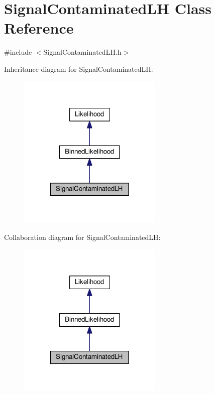 \hypertarget{classSignalContaminatedLH}{\section{Signal\-Contaminated\-L\-H Class Reference}
\label{classSignalContaminatedLH}
}


{\ttfamily \#include $<$Signal\-Contaminated\-L\-H.\-h$>$}



Inheritance diagram for Signal\-Contaminated\-L\-H\-:
\nopagebreak
\begin{figure}[H]
\begin{center}
\leavevmode
\includegraphics[width=196pt]{classSignalContaminatedLH__inherit__graph}
\end{center}
\end{figure}


Collaboration diagram for Signal\-Contaminated\-L\-H\-:
\nopagebreak
\begin{figure}[H]
\begin{center}
\leavevmode
\includegraphics[width=196pt]{classSignalContaminatedLH__coll__graph}
\end{center}
\end{figure}
